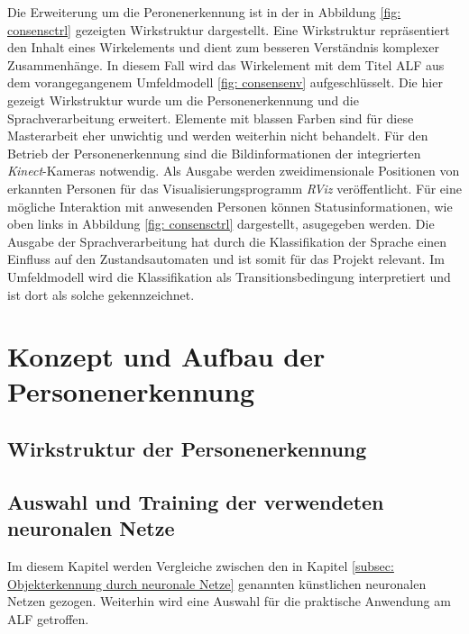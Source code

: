 	Die Erweiterung um die Peronenerkennung ist in der in Abbildung \ref{fig: consensctrl} gezeigten Wirkstruktur dargestellt. Eine Wirkstruktur repräsentiert den Inhalt eines Wirkelements und dient zum besseren Verständnis komplexer Zusammenhänge. In diesem Fall wird das Wirkelement mit dem Titel ALF aus dem vorangegangenem Umfeldmodell \ref{fig: consensenv} aufgeschlüsselt. Die hier gezeigt Wirkstruktur wurde um die Personenerkennung und die Sprachverarbeitung erweitert. Elemente mit blassen Farben sind für diese Masterarbeit eher unwichtig und werden weiterhin nicht behandelt. Für den Betrieb der Personenerkennung sind die Bildinformationen der integrierten \textit{Kinect}-Kameras notwendig. Als Ausgabe werden zweidimensionale Positionen von erkannten Personen für das Visualisierungsprogramm \textit{RViz} veröffentlicht. Für eine mögliche Interaktion mit anwesenden Personen können Statusinformationen, wie oben links in Abbildung \ref{fig: consensctrl} dargestellt, asugegeben werden. Die Ausgabe der Sprachverarbeitung hat durch die Klassifikation der Sprache einen Einfluss auf den Zustandsautomaten und ist somit für das Projekt relevant. Im Umfeldmodell wird die Klassifikation als Transitionsbedingung interpretiert und ist dort als solche gekennzeichnet. \\
		
	
	
	
	
	\section{Konzept und Aufbau der Personenerkennung}
	\label{sec: Konzept Personenerkennung}
	
	
		\subsection{Wirkstruktur der Personenerkennung}
		
		\subsection{Auswahl und Training der verwendeten neuronalen Netze}
		
		Im diesem Kapitel werden Vergleiche zwischen den in Kapitel \ref{subsec: Objekterkennung durch neuronale Netze} genannten künstlichen neuronalen Netzen gezogen. Weiterhin wird eine Auswahl für die praktische Anwendung am ALF getroffen. 
		
			
		
